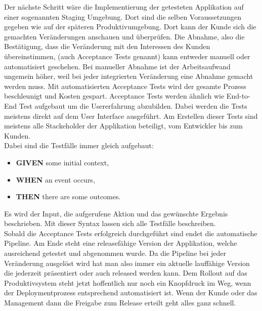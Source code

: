  Der nächste Schritt wäre die Implementierung der getesteten Applikation auf einer sogenannten Staging Umgebung. Dort sind die selben Voraussetzungen gegeben wie auf der späteren Produktivumgebung.\autocite[Vgl.][S.283]{Farley.2010} Dort kann der Kunde sich die gemachten Veränderungen anschauen und überprüfen. Die Abnahme, also die Bestätigung, dass die Veränderung mit den Interessen des Kunden übereinstimmen, (auch Acceptance Tests genannt) kann entweder manuell oder automatisiert geschehen. Bei manueller Abnahme ist der Arbeitsaufwand ungemein höher, weil bei jeder integrierten Veränderung eine Abnahme gemacht werden muss. Mit automatisierten Acceptance Tests wird der gesamte Prozess beschleunigt und Kosten gespart.\autocite[Vgl.][S.310]{Farley.2010} Acceptance Tests werden ähnlich wie End-to-End Test aufgebaut um die Usererfahrung abzubilden. Dabei werden die Tests meistens direkt auf dem User Interface ausgeführt. Am Erstellen dieser Tests sind meistens alle Stackeholder der Applikation beteiligt, vom Entwickler bis zum Kunden.\autocite[Vgl.][S.312]{Farley.2010}\\ Dabei sind die Testfälle immer gleich aufgebaut\autocite[Vgl.][S.312]{Farley.2010}:
 \begin{itemize}
 	\item\textbf{GIVEN} some initial context,
 	\item\textbf{WHEN} an event occurs,
 	\item\textbf{THEN} there are some outcomes.
 \end{itemize}
Es wird der Input, die aufgerufene Aktion und das gewünschte Ergebnis beschrieben. Mit dieser Syntax lassen sich alle Testfälle beschreiben.\autocite[Vgl.][S.312]{Farley.2010}\\
Sobald die Acceptance Tests erfolgreich durchgeführt sind endet die automatische Pipeline. Am Ende steht eine releasefähige Version der Applikation, welche ausreichend getestet und abgenommen wurde. Da die Pipeline bei jeder Veränderung ausgelöst wird hat man also immer ein aktuelle lauffähige Version die jederzeit präsentiert oder auch released werden kann. Dem Rollout auf das Produktivsystem steht jetzt hoffentlich nur noch ein Knopfdruck im Weg, wenn der Deploymentprozess entsprechend automatisiert ist. Wenn der Kunde oder das Management dann die Freigabe zum Release erteilt geht alles ganz schnell.\autocite[Vgl.][S.289]{Farley.2010}
